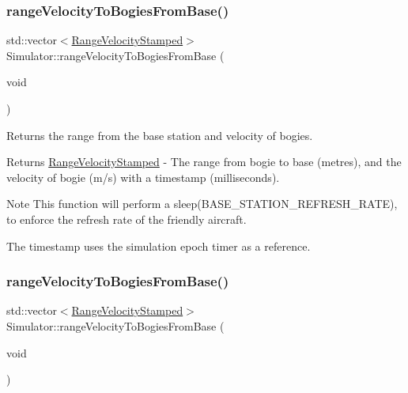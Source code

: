 \subsubsection{\texorpdfstring{range\+Velocity\+To\+Bogies\+From\+Base()}{rangeVelocityToBogiesFromBase()}\hspace{0.1cm}{\footnotesize\ttfamily [1/2]}}
{\footnotesize\ttfamily std\+::vector$<$\hyperlink{structRangeVelocityStamped}{Range\+Velocity\+Stamped}$>$ Simulator\+::range\+Velocity\+To\+Bogies\+From\+Base (\begin{DoxyParamCaption}\item[{void}]{ }\end{DoxyParamCaption})}



Returns the range from the base station and velocity of bogies. 

\begin{DoxyReturn}{Returns}
\hyperlink{structRangeVelocityStamped}{Range\+Velocity\+Stamped} -\/ The range from bogie to base (metres), and the velocity of bogie (m/s) with a timestamp (milliseconds). 
\end{DoxyReturn}
\begin{DoxyNote}{Note}
This function will perform a sleep(\+B\+A\+S\+E\+\_\+\+S\+T\+A\+T\+I\+O\+N\+\_\+\+R\+E\+F\+R\+E\+S\+H\+\_\+\+R\+A\+T\+E), to enforce the refresh rate of the friendly aircraft. 

The timestamp uses the simulation epoch timer as a reference. 
\end{DoxyNote}
\mbox{\label{classSimulator_ae286a7571719440cc06b2441900efb44}} 
\subsubsection{\texorpdfstring{range\+Velocity\+To\+Bogies\+From\+Base()}{rangeVelocityToBogiesFromBase()}\hspace{0.1cm}{\footnotesize\ttfamily [2/2]}}
{\footnotesize\ttfamily std\+::vector$<$\hyperlink{structRangeVelocityStamped}{Range\+Velocity\+Stamped}$>$ Simulator\+::range\+Velocity\+To\+Bogies\+From\+Base (\begin{DoxyParamCaption}\item[{void}]{ }\end{DoxyParamCaption})}



